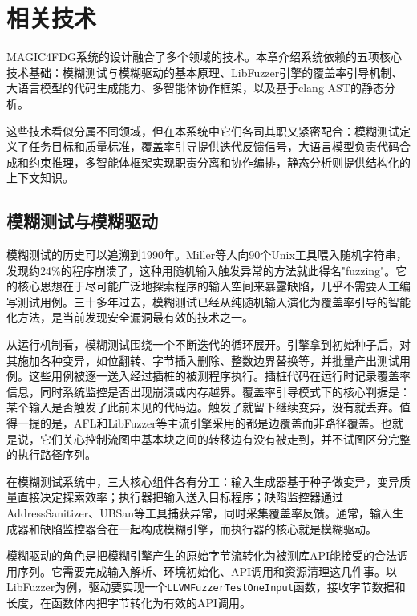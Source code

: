 \chapter{相关技术}

MAGIC4FDG系统的设计融合了多个领域的技术。本章介绍系统依赖的五项核心技术基础：模糊测试与模糊驱动的基本原理、LibFuzzer引擎的覆盖率引导机制、大语言模型的代码生成能力、多智能体协作框架，以及基于clang AST的静态分析。

这些技术看似分属不同领域，但在本系统中它们各司其职又紧密配合：模糊测试定义了任务目标和质量标准，覆盖率引导提供迭代反馈信号，大语言模型负责代码合成和约束推理，多智能体框架实现职责分离和协作编排，静态分析则提供结构化的上下文知识。

\section{模糊测试与模糊驱动}

模糊测试的历史可以追溯到1990年。Miller等人向90个Unix工具喂入随机字符串，发现约24\%的程序崩溃了，这种用随机输入触发异常的方法就此得名"fuzzing"\cite{miller1990}。它的核心思想在于尽可能广泛地探索程序的输入空间来暴露缺陷，几乎不需要人工编写测试用例。三十多年过去，模糊测试已经从纯随机输入演化为覆盖率引导的智能化方法，是当前发现安全漏洞最有效的技术之一\cite{Manès2021}。

从运行机制看，模糊测试围绕一个不断迭代的循环展开。引擎拿到初始种子后，对其施加各种变异，如位翻转、字节插入删除、整数边界替换等，并批量产出测试用例\cite{zhang2016}。这些用例被逐一送入经过插桩的被测程序执行。插桩代码在运行时记录覆盖率信息，同时系统监控是否出现崩溃或内存越界。覆盖率引导模式下的核心判据是：某个输入是否触发了此前未见的代码边。触发了就留下继续变异，没有就丢弃。值得一提的是，AFL和LibFuzzer等主流引擎采用的都是边覆盖而非路径覆盖\cite{hsu2018}。也就是说，它们关心控制流图中基本块之间的转移边有没有被走到，并不试图区分完整的执行路径序列。


在模糊测试系统中，三大核心组件各有分工：输入生成器基于种子做变异，变异质量直接决定探索效率；执行器把输入送入目标程序；缺陷监控器通过AddressSanitizer、UBSan等工具捕获异常，同时采集覆盖率反馈\cite{clusterfuzz2025}。通常，输入生成器和缺陷监控器合在一起构成模糊引擎，而执行器的核心就是模糊驱动。

模糊驱动的角色是把模糊引擎产生的原始字节流转化为被测库API能接受的合法调用序列\cite{Manès2021}。它需要完成输入解析、环境初始化、API调用和资源清理这几件事。以LibFuzzer为例，驱动要实现一个\texttt{LLVMFuzzerTestOneInput}函数，接收字节数据和长度，在函数体内把字节转化为有效的API调用\cite{libfuzzer2024}。

